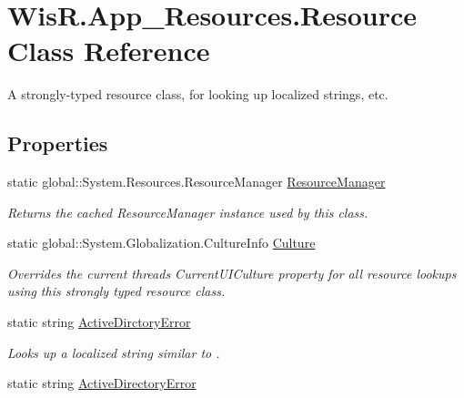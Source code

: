 \hypertarget{class_wis_r_1_1_app___resources_1_1_resource}{}\section{Wis\+R.\+App\+\_\+\+Resources.\+Resource Class Reference}
\label{class_wis_r_1_1_app___resources_1_1_resource}


A strongly-\/typed resource class, for looking up localized strings, etc.  


\subsection*{Properties}
\begin{DoxyCompactItemize}
\item 
static global\+::\+System.\+Resources.\+Resource\+Manager \hyperlink{class_wis_r_1_1_app___resources_1_1_resource_a34966f10f8d78da873c0c70a65fe0462}{Resource\+Manager}
\begin{DoxyCompactList}\small\item\em Returns the cached Resource\+Manager instance used by this class. \end{DoxyCompactList}\item 
static global\+::\+System.\+Globalization.\+Culture\+Info \hyperlink{class_wis_r_1_1_app___resources_1_1_resource_a9dad9904a0dcd39d6d305055f2952433}{Culture}
\begin{DoxyCompactList}\small\item\em Overrides the current thread\textquotesingle{}s Current\+U\+I\+Culture property for all resource lookups using this strongly typed resource class. \end{DoxyCompactList}\item 
static string \hyperlink{class_wis_r_1_1_app___resources_1_1_resource_afbd1ce87e8ee26db26dd7b24e50d75cc}{Active\+Dirctory\+Error}
\begin{DoxyCompactList}\small\item\em Looks up a localized string similar to . \end{DoxyCompactList}\item 
static string \hyperlink{class_wis_r_1_1_app___resources_1_1_resource_abf6298cbd85c0ceaabba51b2a1195207}{Active\+Directory\+Error}

\end{DoxyCompactItemize}
